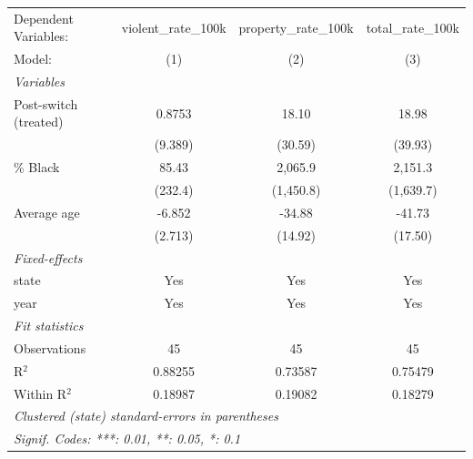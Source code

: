 
\begingroup
\centering
\begin{tabular}{lccc}
   \tabularnewline \midrule \midrule
   Dependent Variables:  & violent\_rate\_100k   & property\_rate\_100k   & total\_rate\_100k\\    
   Model:                & (1)                   & (2)                    & (3)\\  
   \midrule
   \emph{Variables}\\
   Post-switch (treated) & 0.8753                & 18.10                  & 18.98\\   
                         & (9.389)               & (30.59)                & (39.93)\\   
   \% Black              & 85.43                 & 2,065.9                & 2,151.3\\   
                         & (232.4)               & (1,450.8)              & (1,639.7)\\   
   Average age           & -6.852                & -34.88                 & -41.73\\   
                         & (2.713)               & (14.92)                & (17.50)\\   
   \midrule
   \emph{Fixed-effects}\\
   state                 & Yes                   & Yes                    & Yes\\  
   year                  & Yes                   & Yes                    & Yes\\  
   \midrule
   \emph{Fit statistics}\\
   Observations          & 45                    & 45                     & 45\\  
   R$^2$                 & 0.88255               & 0.73587                & 0.75479\\  
   Within R$^2$          & 0.18987               & 0.19082                & 0.18279\\  
   \midrule \midrule
   \multicolumn{4}{l}{\emph{Clustered (state) standard-errors in parentheses}}\\
   \multicolumn{4}{l}{\emph{Signif. Codes: ***: 0.01, **: 0.05, *: 0.1}}\\
\end{tabular}
\par\endgroup


